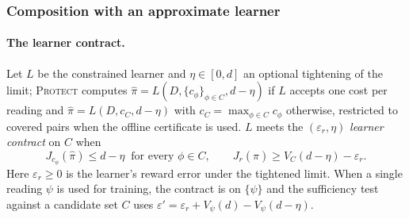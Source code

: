 \subsubsection*{Composition with an approximate learner}
\label{app:proof-approx}

\paragraph{The learner contract.} Let \(L\) be the constrained learner and
\(\eta\in[0,d]\) an optional tightening of the limit; \textsc{Protect} computes
\(\hat\pi=L(D,\{c_\phi\}_{\phi\in C},d-\eta)\) if \(L\) accepts one cost per reading and
\(\hat\pi=L(D,c_C,d-\eta)\) with \(c_C=\max_{\phi\in C}c_\phi\) otherwise, restricted to
covered pairs when the offline certificate is used. \(L\) meets the
\((\varepsilon_r,\eta)\) \emph{learner contract} on \(C\) when
\begin{equation}
J_{c_\phi}(\hat\pi)\leq d-\eta\ \text{ for every }\phi\in C,
\qquad
J_r(\hat\pi)\geq V_C(d-\eta)-\varepsilon_r .
\label{eq:contract}
\end{equation}
Here \(\varepsilon_r\geq0\) is the learner's reward error under the tightened limit.
When a single reading \(\psi\) is used for training, the contract is on \(\{\psi\}\)
and the sufficiency test against a candidate set \(C\) uses
\(\varepsilon'=\varepsilon_r+V_\psi(d)-V_\psi(d-\eta)\).

